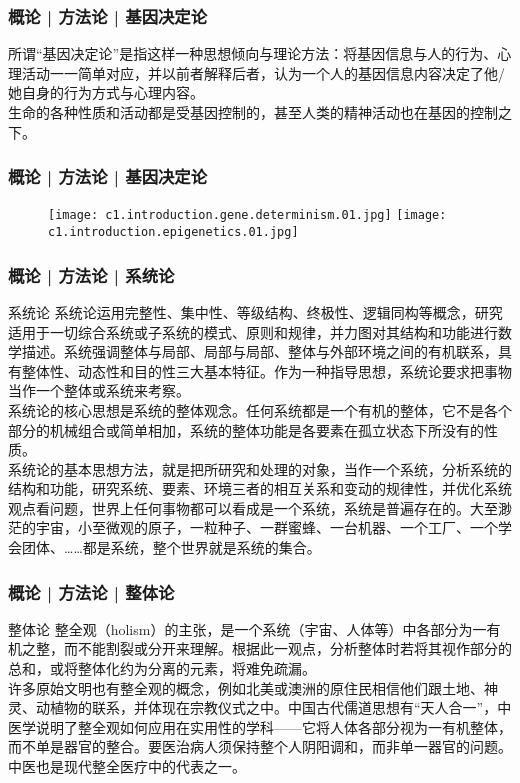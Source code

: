 \begin{frame}
  \frametitle{概论 | 方法论 | 基因决定论}
所谓“基因决定论”是指这样一种思想倾向与理论方法：将基因信息与人的行为、心理活动一一简单对应，并以前者解释后者，认为一个人的基因信息内容决定了他/她自身的行为方式与心理内容。\\
\vspace{1em}
  生命的各种性质和活动都是受基因控制的，甚至人类的精神活动也在基因的控制之下。
\end{frame}

\begin{frame}
  \frametitle{概论 | 方法论 | 基因决定论}
  \begin{figure}
    \centering
    \texttt{[image: c1.introduction.gene.determinism.01.jpg]}\qquad
    \texttt{[image: c1.introduction.epigenetics.01.jpg]}
  \end{figure}
\end{frame}

\begin{frame}
  \frametitle{概论 | 方法论 | 系统论}
  \begin{block}{系统论}
系统论运用完整性、集中性、等级结构、终极性、逻辑同构等概念，研究适用于一切综合系统或子系统的模式、原则和规律，并力图对其结构和功能进行数学描述。系统强调整体与局部、局部与局部、整体与外部环境之间的有机联系，具有整体性、动态性和目的性三大基本特征。作为一种指导思想，系统论要求把事物当作一个整体或系统来考察。\\
\vspace{1em}
系统论的核心思想是系统的整体观念。任何系统都是一个有机的整体，它不是各个部分的机械组合或简单相加，系统的整体功能是各要素在孤立状态下所没有的性质。\\
\vspace{1em}
系统论的基本思想方法，就是把所研究和处理的对象，当作一个系统，分析系统的结构和功能，研究系统、要素、环境三者的相互关系和变动的规律性，并优化系统观点看问题，世界上任何事物都可以看成是一个系统，系统是普遍存在的。大至渺茫的宇宙，小至微观的原子，一粒种子、一群蜜蜂、一台机器、一个工厂、一个学会团体、……都是系统，整个世界就是系统的集合。
  \end{block}
\end{frame}

\begin{frame}
  \frametitle{概论 | 方法论 | 整体论}
  \begin{block}{整体论}
整全观（holism）的主张，是一个系统（宇宙、人体等）中各部分为一有机之整，而不能割裂或分开来理解。根据此一观点，分析整体时若将其视作部分的总和，或将整体化约为分离的元素，将难免疏漏。\\
\vspace{1em}
许多原始文明也有整全观的概念，例如北美或澳洲的原住民相信他们跟土地、神灵、动植物的联系，并体现在宗教仪式之中。中国古代儒道思想有“天人合一”，中医学说明了整全观如何应用在实用性的学科——它将人体各部分视为一有机整体，而不单是器官的整合。要医治病人须保持整个人阴阳调和，而非单一器官的问题。中医也是现代整全医疗中的代表之一。
  \end{block}
\end{frame}

